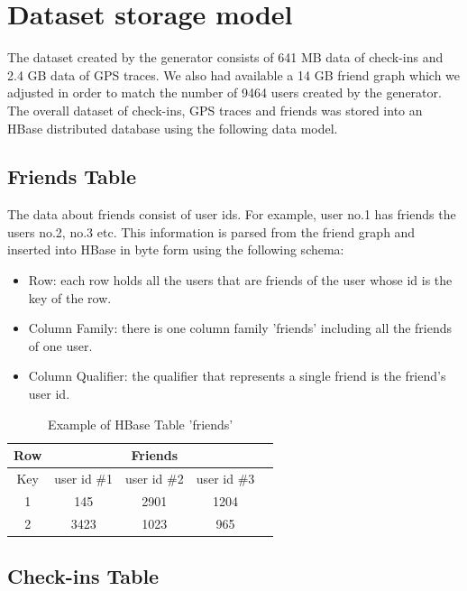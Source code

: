 \section{Dataset storage model}

The dataset created by the generator consists of 641 MB data of check-ins and 2.4 GB data of GPS traces. We also had available a 14 GB friend graph which 
we adjusted in order to match the number of 9464 users created by the generator. The overall dataset of check-ins, GPS traces and friends was stored 
into an HBase distributed database using the following data model.

\subsection{Friends Table}

The data about friends consist of user ids. For example, user no.1 has friends the users no.2, no.3 etc. This information is parsed from the friend graph and 
inserted into HBase in byte form using the following schema:

\begin{itemize}
 \item Row: each row holds all the users that are friends of the user whose id is the key of the row.
 \item Column Family: there is one column family 'friends' including all the friends of one user.
 \item Column Qualifier: the qualifier that represents a single friend is the friend's user id.
\end{itemize}

\begin{table}[H]
\begin{center}
\begin{tabular}{|c|c|c|c|c|}
 \hline
 Row & \multicolumn{3}{|c|}{Friends} \\
 \hline
 Key & user id \#1 & user id \#2 & user id \#3 \\
 \hline
 1 & 145 & 2901 & 1204 \\ \hline 
 2 & 3423 & 1023 & 965 \\
 \hline
\end{tabular}
\end{center}
\caption{Example of HBase Table 'friends'}
\end{table}

\subsection{Check-ins Table}

